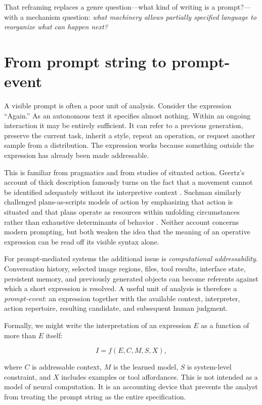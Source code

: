 \documentclass[11pt]{article}
\begin{document}
That reframing replaces a genre question---what kind of writing is a prompt?---with a mechanism question: \emph{what machinery allows partially specified language to reorganize what can happen next?}

\section{From prompt string to prompt-event}

A visible prompt is often a poor unit of analysis. Consider the expression ``Again.'' As an autonomous text it specifies almost nothing. Within an ongoing interaction it may be entirely sufficient. It can refer to a previous generation, preserve the current task, inherit a style, repeat an operation, or request another sample from a distribution. The expression works because something outside the expression has already been made addressable.

This is familiar from pragmatics and from studies of situated action. Geertz's account of thick description famously turns on the fact that a movement cannot be identified adequately without its interpretive context \parencite{geertz1973thick}. Suchman similarly challenged plans-as-scripts models of action by emphasizing that action is situated and that plans operate as resources within unfolding circumstances rather than exhaustive determinants of behavior \parencite{suchman1987plans}. Neither account concerns modern prompting, but both weaken the idea that the meaning of an operative expression can be read off its visible syntax alone.

For prompt-mediated systems the additional issue is \emph{computational addressability}. Conversation history, selected image regions, files, tool results, interface state, persistent memory, and previously generated objects can become referents against which a short expression is resolved. A useful unit of analysis is therefore a \emph{prompt-event}: an expression together with the available context, interpreter, action repertoire, resulting candidate, and subsequent human judgment.

Formally, we might write the interpretation of an expression $E$ as a function of more than $E$ itself:

\[
I = f(E, C, M, S, X),
\]

where $C$ is addressable context, $M$ is the learned model, $S$ is system-level constraint, and $X$ includes examples or tool affordances. This is not intended as a model of neural computation. It is an accounting device that prevents the analyst from treating the prompt string as the entire specification.
\end{document}

